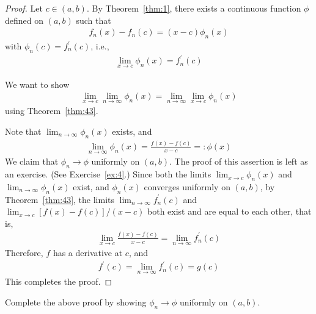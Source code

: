 \documentclass[thmcnt=section, 12pt]{my-elegantbook}
\begin{document}
\begin{proof}
    Let $c \in (a, b)$. By Theorem~\ref{thm:1}, there exists a continuous function $\phi$ defined on $(a, b)$ such that
    \begin{align*}
        f_n(x) - f_n(c) = (x - c) \phi_n(x)
    \end{align*}
    with $\phi_n(c) = f^\prime_n(c)$, i.e.,
    \begin{align*}
        \lim_{x \to c} \phi_n(x)=  f^\prime_n(c)
    \end{align*}
    \begin{note}
        We want to show
        \begin{align*}
            \lim_{x \to c} \lim_{n \to \infty} \phi_n(x)
            = \lim_{n \to \infty} \lim_{x \to c} \phi_n(x)
        \end{align*}
        using Theorem~\ref{thm:43}.
    \end{note}
    Note that $\lim_{n \to \infty}\phi_n(x)$ exists, and
    \begin{align*}
        \lim_{n \to \infty}\phi_n(x) = \frac{f(x) - f(c)}{x - c} =: \phi(x)
    \end{align*}
    We claim that $\phi_n \to \phi$ uniformly on $(a, b)$. The proof of this assertion is left as an exercise. (See Exercise~\ref{ex:4}.) Since both the limits $\lim_{x \to c} \phi_n(x)$ and $\lim_{n \to \infty} \phi_n(x)$ exist, and $\phi_n(x)$ converges uniformly on $(a, b)$, by Theorem~\ref{thm:43}, the limits $\lim_{n \to \infty} f^\prime_n(c)$ and $\lim_{x \to c} [f(x) - f(c)] / (x - c)$ both exist and are equal to each other, that is,
    \begin{align*}
        \lim_{x \to c} \frac{f(x) - f(c)}{x - c}
        = \lim_{n \to \infty} f^\prime_n(c)
    \end{align*}
    Therefore, $f$ has a derivative at $c$, and
    \begin{align*}
        f^\prime(c) = \lim_{n \to \infty} f^\prime_n(c) = g(c)
    \end{align*}
    This completes the proof.
\end{proof}

\begin{exercise}
    Complete the above proof by showing $\phi_n \to \phi$ uniformly on $(a, b)$.
    \label{ex:4}
\end{exercise}
\end{document}
